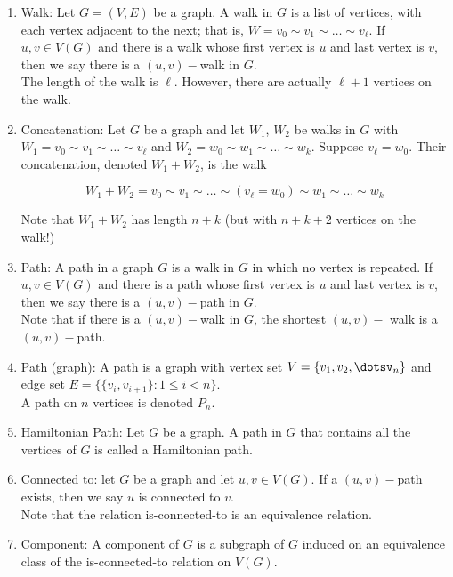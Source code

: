 \documentclass{article}
\begin{document}
\begin{enumerate}
    \item Walk: Let $G=(V,E)$ be a graph.
    A walk in $G$ is a list of vertices, with each vertex adjacent to the next;
    that is, $W=v_0\sim v_1\sim\dots\sim v_\ell$.
    If $u,v\in V(G)$ and there is a walk whose first vertex is $u$ and last vertex is $v$, then we say there is a $(u,v)-$walk in $G$.\\
    
    The length of the walk is $\ell$.
    However, there are actually $\ell +1$ vertices on the walk.
    
    \item Concatenation: Let $G$ be a graph and let $W_1$, $W_2$ be walks in $G$ with $W_1=v_0\sim v_1\sim \dots\sim v_\ell$ and $W_2=w_0\sim w_1\sim \dots\sim w_k$.
    Suppose $v_\ell=w_0$.
    Their concatenation, denoted $W_1+W_2$, is the walk
    
    \[W_1+W_2=v_0\sim v_1\sim\dots\sim(v_\ell=w_0)\sim w_1\sim\dots\sim w_k\]
    
    Note that $W_1+W_2$ has length $n+k$ (but with $n+k+2$ vertices on the walk!)
    
    \item Path: A path in a graph $G$ is a walk in $G$ in which no vertex is repeated.
    If $u,v\in V(G)$ and there is a path whose first vertex is $u$ and last vertex is $v$, then we say there is a $(u,v)-$path in $G$. \\
    
    Note that if there is a $(u,v)-$walk in $G$, the shortest $(u,v)-$ walk is a $(u,v)-$path.
    
    \item Path (graph): A path is a graph with vertex set $V=\{v_1,v_2,\dotsv_n\}$ and edge set $E=\{\{v_i,v_{i+1}\}:1\leq i<n\}$.\\
    
    A path on $n$ vertices is denoted $P_n$.
    
    \item Hamiltonian Path: Let $G$ be a graph.
    A path in $G$ that contains all the vertices of $G$ is called a Hamiltonian path.
    
    \item Connected to: let $G$ be a graph and let $u,v\in V(G)$.
    If a $(u,v)-$path exists, then we say $u$ is connected to $v$.\\
    
    Note that the relation is-connected-to is an equivalence relation.
    
    \item Component: A component of $G$ is a subgraph of $G$ induced on an equivalence class of the is-connected-to relation on $V(G)$.
    

\end{enumerate}
\end{document}
